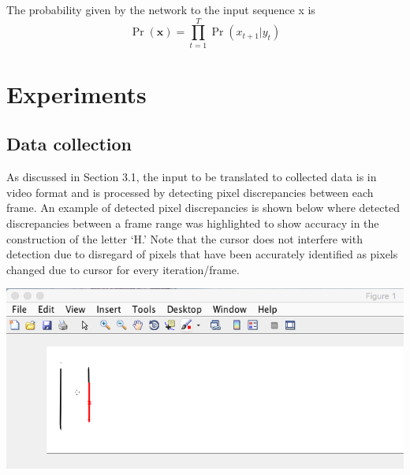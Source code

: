 \documentclass{article} %
\begin{document}
The probability given by the network to the input sequence x is
\begin{equation}
\Pr(\mathbf{x}) = \prod_{t=1}^T{\Pr(x_{t+1}|y_t)}
\end{equation}



\section{Experiments}
\subsection{Data collection}

As discussed in Section 3.1, the input to be translated to collected data is in video format and is processed by detecting pixel discrepancies between each frame. An example of detected pixel discrepancies is shown below where detected discrepancies between a frame range was highlighted to show accuracy in the construction of the letter ‘H.’ Note that the cursor does not interfere with detection due to disregard of pixels that have been accurately identified as pixels changed due to cursor for every iteration/frame.
\begin{center}
\includegraphics[scale = 0.4]{detection_data.png}
\end{center}
\end{document}
